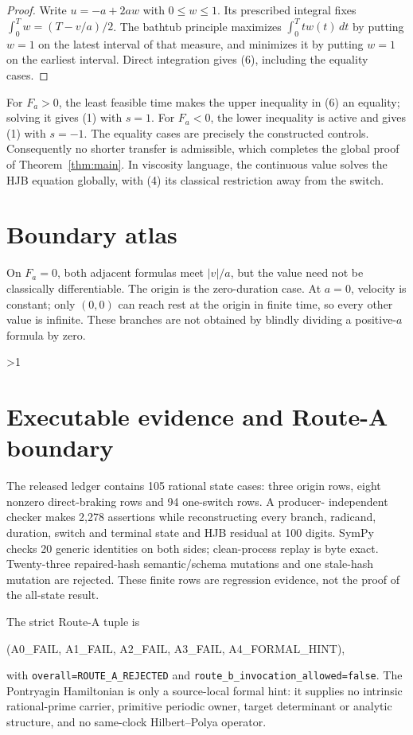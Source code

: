 \documentclass[11pt]{article}
\begin{document}
\begin{proof}
Write $u=-a+2aw$ with $0\leq w\leq1$.  Its prescribed integral fixes
$\int_0^T w=(T-v/a)/2$.  The bathtub principle maximizes
$\int_0^Ttw(t)\,dt$ by putting $w=1$ on the latest interval of that measure,
and minimizes it by putting $w=1$ on the earliest interval.  Direct
integration gives (6), including the equality cases.
\end{proof}

For $F_a>0$, the least feasible time makes the upper inequality in (6) an
equality; solving it gives (1) with $s=1$.  For $F_a<0$, the lower inequality
is active and gives (1) with $s=-1$.  The equality cases are precisely the
constructed controls.  Consequently no shorter transfer is admissible, which
completes the global proof of Theorem~\ref{thm:main}.  In viscosity language,
the continuous value solves the HJB equation globally, with (4) its classical
restriction away from the switch.

\section{Boundary atlas}
On $F_a=0$, both adjacent formulas meet $|v|/a$, but the value need not be
classically differentiable.  The origin is the zero-duration case.  At
$a=0$, velocity is constant; only $(0,0)$ can reach rest at the origin in
finite time, so every other value is infinite.  These branches are not
obtained by blindly dividing a positive-$a$ formula by zero.
\fi

\ifnum\CRevisionRound>1
\section{Executable evidence and Route-A boundary}
The released ledger contains 105 rational state cases: three origin rows,
eight nonzero direct-braking rows and 94 one-switch rows.  A producer-
independent checker makes 2,278 assertions while reconstructing every branch,
radicand, duration, switch and terminal state and HJB residual at 100 digits.
SymPy checks 20 generic identities on both sides; clean-process replay is
byte exact.  Twenty-three repaired-hash semantic/schema mutations and one
stale-hash mutation are rejected.  These finite rows are regression evidence,
not the proof of the all-state result.

The strict Route-A tuple is
\begin{center}\ttfamily
(A0\_FAIL, A1\_FAIL, A2\_FAIL, A3\_FAIL, A4\_FORMAL\_HINT),
\end{center}
with \texttt{overall=ROUTE\_A\_REJECTED} and
\texttt{route\_b\_invocation\_allowed=false}.  The Pontryagin Hamiltonian is
only a source-local formal hint: it supplies no intrinsic rational-prime
carrier, primitive periodic owner, target determinant or analytic structure,
and no same-clock Hilbert--Polya operator.
\fi
\end{document}
